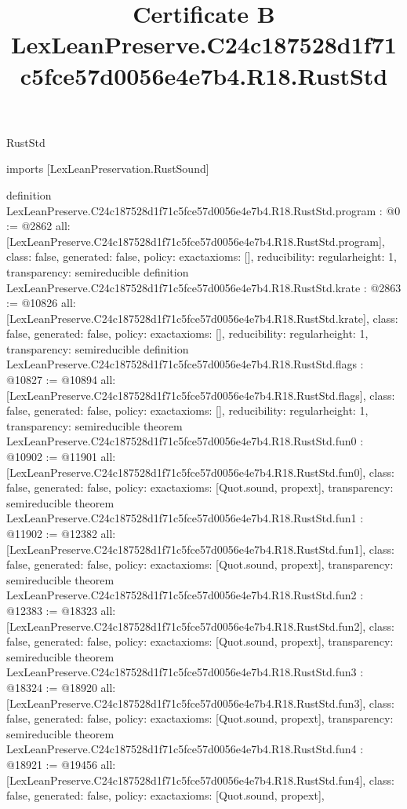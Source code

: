 \begin{lexlean}{RustStd}
\title{Certificate B LexLeanPreserve.C24c187528d1f71c5fce57d0056e4e7b4.R18.RustStd}
\begin{coremodule}
imports [LexLeanPreservation.RustSound]

definition LexLeanPreserve.C24c187528d1f71c5fce57d0056e4e7b4.R18.RustStd.program : @0 := @2862 {
  all: [LexLeanPreserve.C24c187528d1f71c5fce57d0056e4e7b4.R18.RustStd.program],
  class: false,
  generated: false,
  policy: exact{axioms: []},
  reducibility: regular{height: 1},
  transparency: semireducible
}
definition LexLeanPreserve.C24c187528d1f71c5fce57d0056e4e7b4.R18.RustStd.krate : @2863 := @10826 {
  all: [LexLeanPreserve.C24c187528d1f71c5fce57d0056e4e7b4.R18.RustStd.krate],
  class: false,
  generated: false,
  policy: exact{axioms: []},
  reducibility: regular{height: 1},
  transparency: semireducible
}
definition LexLeanPreserve.C24c187528d1f71c5fce57d0056e4e7b4.R18.RustStd.flags : @10827 := @10894 {
  all: [LexLeanPreserve.C24c187528d1f71c5fce57d0056e4e7b4.R18.RustStd.flags],
  class: false,
  generated: false,
  policy: exact{axioms: []},
  reducibility: regular{height: 1},
  transparency: semireducible
}
theorem LexLeanPreserve.C24c187528d1f71c5fce57d0056e4e7b4.R18.RustStd.fun0 : @10902 := @11901 {
  all: [LexLeanPreserve.C24c187528d1f71c5fce57d0056e4e7b4.R18.RustStd.fun0],
  class: false,
  generated: false,
  policy: exact{axioms: [Quot.sound, propext]},
  transparency: semireducible
}
theorem LexLeanPreserve.C24c187528d1f71c5fce57d0056e4e7b4.R18.RustStd.fun1 : @11902 := @12382 {
  all: [LexLeanPreserve.C24c187528d1f71c5fce57d0056e4e7b4.R18.RustStd.fun1],
  class: false,
  generated: false,
  policy: exact{axioms: [Quot.sound, propext]},
  transparency: semireducible
}
theorem LexLeanPreserve.C24c187528d1f71c5fce57d0056e4e7b4.R18.RustStd.fun2 : @12383 := @18323 {
  all: [LexLeanPreserve.C24c187528d1f71c5fce57d0056e4e7b4.R18.RustStd.fun2],
  class: false,
  generated: false,
  policy: exact{axioms: [Quot.sound, propext]},
  transparency: semireducible
}
theorem LexLeanPreserve.C24c187528d1f71c5fce57d0056e4e7b4.R18.RustStd.fun3 : @18324 := @18920 {
  all: [LexLeanPreserve.C24c187528d1f71c5fce57d0056e4e7b4.R18.RustStd.fun3],
  class: false,
  generated: false,
  policy: exact{axioms: [Quot.sound, propext]},
  transparency: semireducible
}
theorem LexLeanPreserve.C24c187528d1f71c5fce57d0056e4e7b4.R18.RustStd.fun4 : @18921 := @19456 {
  all: [LexLeanPreserve.C24c187528d1f71c5fce57d0056e4e7b4.R18.RustStd.fun4],
  class: false,
  generated: false,
  policy: exact{axioms: [Quot.sound, propext]},
}
\end{coremodule}
\end{lexlean}
